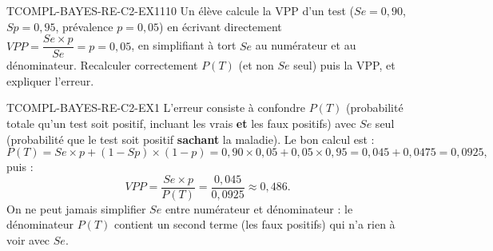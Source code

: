 

\begin{exercice}{TCOMPL-BAYES-RE-C2-EX1}{1}{10}
Un élève calcule la VPP d'un test ($Se=0{,}90$, $Sp=0{,}95$, prévalence $p=0{,}05$) en écrivant directement $VPP = \dfrac{Se\times p}{Se} = p = 0{,}05$, en simplifiant à tort $Se$ au numérateur et au dénominateur. Recalculer correctement $P(T)$ (et non $Se$ seul) puis la VPP, et expliquer l'erreur.
\end{exercice}


\begin{corrige}{TCOMPL-BAYES-RE-C2-EX1}
L'erreur consiste à confondre $P(T)$ (probabilité totale qu'un test soit positif, incluant les vrais \textbf{et} les faux positifs) avec $Se$ seul (probabilité que le test soit positif \textbf{sachant} la maladie). Le bon calcul est :
\[
  P(T) = Se\times p + (1-Sp)\times(1-p) = 0{,}90\times0{,}05+0{,}05\times0{,}95 = 0{,}045+0{,}0475 = 0{,}0925,
\]
puis :
\[
  VPP = \frac{Se\times p}{P(T)} = \frac{0{,}045}{0{,}0925} \approx 0{,}486.
\]
On ne peut jamais simplifier $Se$ entre numérateur et dénominateur : le dénominateur $P(T)$ contient un second terme (les faux positifs) qui n'a rien à voir avec $Se$.
\end{corrige}
